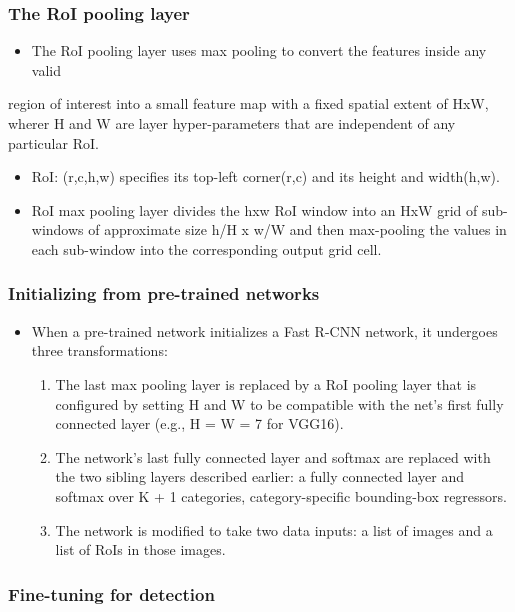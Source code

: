 \documentclass[11pt]{article}
\begin{document}
\subsubsection{The RoI pooling layer}
\label{sec-1-1-1}

\begin{itemize}
\item The RoI pooling layer uses max pooling to convert the features inside any valid
\end{itemize}
    region of interest into a small feature map with a fixed spatial extent of HxW,
    wherer H and W are layer hyper-parameters that are independent of any particular RoI.

\begin{itemize}
\item RoI: (r,c,h,w) specifies its top-left corner(r,c) and its height and width(h,w).
\item RoI max pooling layer divides the hxw RoI window into an HxW grid of sub-windows of
      approximate size h/H x w/W and then max-pooling the values in each sub-window into 
      the corresponding output grid cell.
\end{itemize}
\subsubsection{Initializing from pre-trained networks}
\label{sec-1-1-2}


\begin{itemize}
\item When a pre-trained network initializes a Fast R-CNN network, it undergoes three
      transformations:
\begin{enumerate}
\item The last max pooling layer is replaced by a RoI pooling layer that is configured
         by setting H and W to be compatible with the net's first fully connected layer
         (e.g., H = W = 7 for VGG16).
\item The network's last fully connected layer and softmax are replaced with the two 
         sibling layers described earlier: a fully connected layer and softmax over K + 1
         categories, category-specific bounding-box regressors.
\item The network is modified to take two data inputs: a list of images and a list of
         RoIs in those images.
\end{enumerate}
\end{itemize}
\subsubsection{Fine-tuning for detection}
\label{sec-1-1-3}
\end{document}

